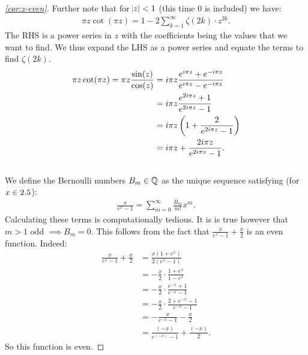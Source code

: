 \begin{proof}[\ref{cor:z-even}]
Further note that for $\abs{z} < 1$ (this time $0$ is included) we have:
\begin{align*}
    \pi z \cot(\pi z) = 1 - 2 \sum_{k=1}^\infty \zeta(2k) \cdot z^{2k}.
\end{align*}
The RHS is a power series in $z$ with the coefficients being the values that we want to find. We thus expand the LHS as a power series and equate the terms to find $\zeta(2k)$.
\begin{align*}
    \pi z \cot(\pi z) = \pi z \frac{\sin(z)}{\cos(z)} &= i \pi z \frac{e^{i \pi z} + e^{-i \pi z}}{e^{i \pi z} - e^{-i \pi z}}\\
    & = i \pi z \frac{e^{2 i \pi z} + 1}{e^{2 i \pi z} - 1}\\
    &= i \pi z \left(  1 + \frac{2}{e^{2 i \pi z} - 1}  \right)\\
    &= i \pi z + \frac{2i \pi z}{e^{2 i \pi z} - 1}.
\end{align*}\\
We define the Bernoulli numbers $B_m \in \mathbb{Q}$ as the unique sequence satisfying (for $x \in 2.5$):
\begin{align*}
    \frac{x}{e^x - 1} = \sum_{m=0}^\infty \frac{B_m}{m!} x^m.
\end{align*}
Calculating these terms is computationally tedious. It is is true however that $m>1 \text{ odd } \implies B_m = 0$. This follows from the fact that $\frac{x}{e^x - 1} + \frac{x}{2}$ is an even function. Indeed:
\begin{align*}\frac{x}{e^x - 1} + \frac{x}{2} &= \frac{x(1+e^x)}{2(e^x-1)} \\&= - \frac{x}{2} \cdot \frac{1+e^x}{1-e^x}\\
&= - \frac{x}{2} \cdot \frac{e^{-x} + 1}{e^{-x} - 1}\\
&= - \frac{x}{2} \cdot \frac{2+e^{-x} -1}{e^{-x} - 1}\\
&= - \frac{x}{e^{-x}-1} - \frac{x}{2}\\
&=  \frac{(-x)}{e^{(-x)}-1} + \frac{(-x)}{2}.
\end{align*}
So this function is even.


\end{proof}
